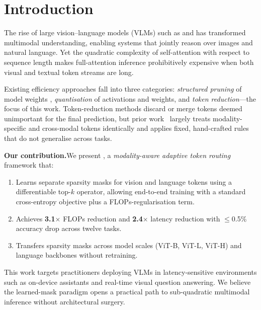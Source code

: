 
\section{Introduction}

The rise of large vision--language models (VLMs) such as
\citet{radford2021clip} and \citet{dosovitskiy2021vit} has transformed
multimodal understanding, enabling systems that jointly reason over
images and natural language. Yet the quadratic complexity of
self-attention with respect to sequence length makes full-attention
inference prohibitively expensive when both visual and textual token
streams are long.

Existing efficiency approaches fall into three categories:
\textit{structured pruning} of model weights
\citep{he2016resnet}, \textit{quantisation} of activations and weights,
and \textit{token reduction}---the focus of this work.
Token-reduction methods discard or merge tokens deemed unimportant for
the final prediction, but prior work~\citep{chen2021simclr} largely
treats modality-specific and cross-modal tokens identically and
applies fixed, hand-crafted rules that do not generalise across tasks.

\textbf{Our contribution.}\quad We present \modelname{}, a
\emph{modality-aware adaptive token routing} framework that:
\begin{enumerate}[leftmargin=*, label=(\roman*), itemsep=2pt, topsep=2pt]
  \item Learns separate sparsity masks for vision and language tokens
        using a differentiable top-\(k\) operator, allowing end-to-end
        training with a standard cross-entropy objective plus a
        FLOPs-regularisation term.
  \item Achieves \textbf{3.1\(\times\)} FLOPs reduction and
        \textbf{2.4\(\times\)} latency reduction with
        \(\leq\)0.5\% accuracy drop across twelve \dataset{} tasks.
  \item Transfers sparsity masks across model scales (ViT-B, ViT-L,
        ViT-H) and language backbones without retraining.
\end{enumerate}

This work targets practitioners deploying VLMs in latency-sensitive
environments such as on-device assistants and real-time visual
question answering. We believe the learned-mask paradigm opens a
practical path to sub-quadratic multimodal inference without
architectural surgery.
